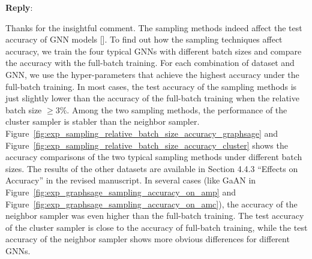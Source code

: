 \documentclass[12pt]{article}
\newenvironment{reply}
   {\medskip \noindent \textbf{Reply}:\  }
   {\medskip}
\begin{document}
\begin{reply}

    Thanks for the insightful comment.
    The sampling methods indeed affect the test accuracy of GNN models [\cite{hamilton2017_graphsage, chiang2019_cluster_gcn, zeng2020_graphsaint}].
    To find out how the sampling techniques affect accuracy, we train the four typical GNNs with different batch sizes and compare the accuracy with the full-batch training.
    For each combination of dataset and GNN, we use the hyper-parameters that achieve the highest accuracy under the full-batch training.
    In most cases, the test accuracy of the sampling methods is just slightly lower than the accuracy of the full-batch training when the relative batch size $\geq 3\%$.
    Among the two sampling methods, the performance of the cluster sampler is stabler than the neighbor sampler.
    Figure~\ref{fig:exp_sampling_relative_batch_size_accuracy_graphsage}  and Figure~\ref{fig:exp_sampling_relative_batch_size_accuracy_cluster} shows the accuracy comparisons of the two typical sampling methods under different batch sizes.
    The results of the other datasets are available in Section 4.4.3 ``Effects on Accuracy'' in the revised manuscript.
    In several cases (like GaAN in Figure~\ref{fig:exp_graphsage_sampling_accuracy_on_amp} and Figure~\ref{fig:exp_graphsage_sampling_accuracy_on_amc}), the accuracy of the neighbor sampler was even higher than the full-batch training.
    The test accuracy of the cluster sampler is close to the accuracy of full-batch training, while the test accuracy of the neighbor sampler shows more obvious differences for different GNNs.
        


\end{reply}
\end{document}
